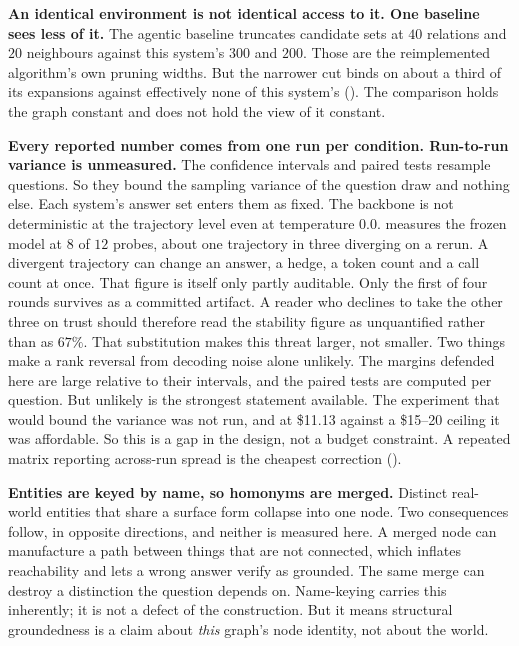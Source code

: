 \textbf{An identical environment is not identical access to it. One baseline
sees less of it.} The agentic baseline truncates candidate sets at $40$
relations and $20$ neighbours against this system's $300$ and $200$. Those are
the reimplemented algorithm's own pruning widths. But the narrower cut binds on
about a third of its expansions against effectively none of this system's
(). The comparison holds the graph constant and does not
hold the view of it constant.

\textbf{Every reported number comes from one run per condition. Run-to-run
variance is unmeasured.} The confidence intervals and paired tests resample
questions. So they bound the sampling variance of the question draw and nothing
else. Each system's answer set enters them as fixed. The backbone is not
deterministic at the trajectory level even at temperature $0.0$.
 measures the frozen model at $8$ of $12$ probes, about one
trajectory in three diverging on a rerun. A divergent trajectory can change an
answer, a hedge, a token count and a call count at once. That figure is itself
only partly auditable. Only the first of four rounds survives as a committed
artifact. A reader who declines to take the other three on trust should
therefore read the stability figure as unquantified rather than as $67\%$. That
substitution makes this threat larger, not smaller. Two things make a rank
reversal from decoding noise alone unlikely. The margins defended here are large
relative to their intervals, and the paired tests are computed per question. But
unlikely is the strongest statement available. The experiment that would bound
the variance was not run, and at \$11.13 against a \$15--20 ceiling it was
affordable. So this is a gap in the design, not a budget constraint. A repeated
matrix reporting across-run spread is the cheapest correction
().

\textbf{Entities are keyed by name, so homonyms are merged.} Distinct real-world
entities that share a surface form collapse into one node. Two consequences
follow, in opposite directions, and neither is measured here. A merged node can
manufacture a path between things that are not connected, which inflates
reachability and lets a wrong answer verify as grounded. The same merge can
destroy a distinction the question depends on. Name-keying carries this
inherently; it is not a defect of the construction. But it means structural
groundedness is a claim about \emph{this} graph's node identity, not about the
world.

